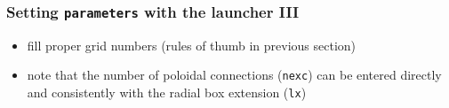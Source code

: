 \documentclass[9pt]{beamer}
\begin{document}
{
\begin{frame}[fragile]
  \frametitle{Setting {\tt parameters} with the launcher III}

\vspace{5.25cm}

\begin{block}{}
\begin{itemize}
\item fill proper grid numbers (rules of thumb in previous section)
\item note that the number of poloidal connections ({\tt nexc}) can be entered directly and consistently with the radial box extension ({\tt lx})
\end{itemize}
\end{block}

\end{frame}
}

\end{document}
